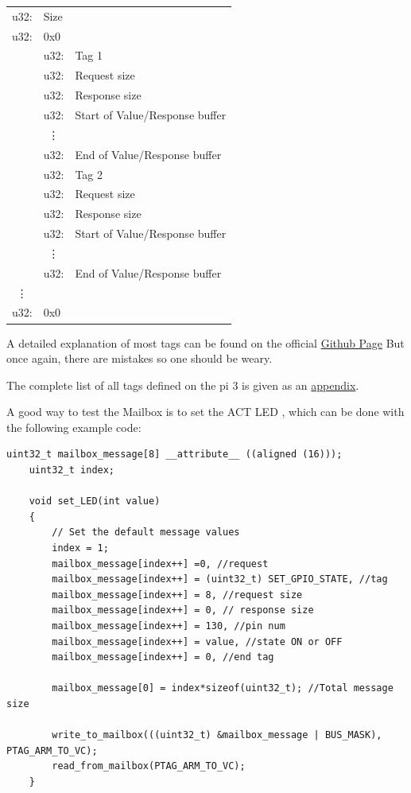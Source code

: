 \documentclass[12pt, svgnames]{book}
\begin{document}
\begin{center}
	{
		\begin{tabular}{c l l}
			u32:	&Size &\\
			u32:	&0x0	&\\	
			&	u32: &Tag 1\\
			&	u32: &Request size\\
			&	u32: &Response size\\
			& 	u32: &Start of Value/Response buffer\\
			&	\multicolumn{1}{c}{\vdots}	&\\
			&	u32:	& End of Value/Response buffer\\
			&	u32: &Tag 2\\
			&	u32: &Request size\\
			&	u32: &Response size\\
			& 	u32: &Start of Value/Response buffer\\
			&	\multicolumn{1}{c}{\vdots}	&\\
			&	u32:	& End of Value/Response buffer\\
			\multicolumn{1}{c}{\vdots} & &\\
			u32: & 0x0 &\\
			
		\end{tabular}
	}
\end{center}

A detailed explanation of most tags can be found on the official \href{https://github.com/raspberrypi/firmware/wiki/Mailbox-property-interface}{Github Page} But once again, there are mistakes so one should be weary.

The complete list of all tags defined on the pi 3 is given as an \hyperlink{Mailbox Tags}{appendix}.

A good way to test the Mailbox is to set the ACT LED , which can be done with the following example code:
\newpage
\begin{lstlisting}[style=C]
	uint32_t mailbox_message[8] __attribute__ ((aligned (16)));
	uint32_t index;
	
	void set_LED(int value)
	{
		// Set the default message values
		index = 1;
		mailbox_message[index++] =0, //request
		mailbox_message[index++] = (uint32_t) SET_GPIO_STATE, //tag
		mailbox_message[index++] = 8, //request size
		mailbox_message[index++] = 0, // response size
		mailbox_message[index++] = 130, //pin num
		mailbox_message[index++] = value, //state ON or OFF
		mailbox_message[index++] = 0, //end tag
		
		mailbox_message[0] = index*sizeof(uint32_t); //Total message size
		
		write_to_mailbox(((uint32_t) &mailbox_message | BUS_MASK), PTAG_ARM_TO_VC);
		read_from_mailbox(PTAG_ARM_TO_VC);
	}
\end{lstlisting}
\end{document}
